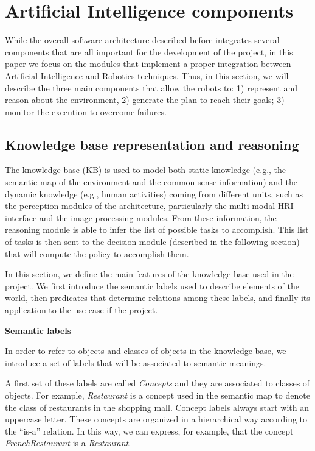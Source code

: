 \section{Artificial Intelligence components}

While the overall software architecture described before integrates several components that are all important for the development of the project, in this paper we focus on the modules that implement a proper integration between Artificial Intelligence and Robotics techniques.
Thus, in this section, we will describe the three main components that allow the robots to: 1) represent and reason about the environment, 2) generate the plan to reach their goals; 3) monitor the execution to overcome failures.



\subsection{Knowledge base representation and reasoning}


The knowledge base (KB) is used to model both static knowledge (e.g., the semantic map of the environment and the common sense information) and the dynamic knowledge (e.g., human activities) coming from different units, such as the perception modules of the architecture, particularly the multi-modal HRI interface and the image processing modules. 
From these information, the reasoning module is able to infer the list of possible tasks to accomplish. This list of tasks is then sent to the decision module (described in the following section) that will compute the policy to accomplish them. 

In this section, we define the main features of the knowledge base used in the project. We first introduce the semantic labels used to describe elements of the world, then predicates that determine relations among these labels, and finally its application to the use case if the project.

\vspace{1em}

\noindent 
\textbf{Semantic labels}

In order to refer to objects and classes of objects in the knowledge base, we introduce a set of labels that will be associated to semantic meanings. 

A first set of these labels are called \emph{Concepts} and they are associated to classes of objects. For example, \emph{Restaurant} is a concept used in the semantic map to denote the class of restaurants in the shopping mall. Concept labels always start with an uppercase letter.
These concepts are organized in a hierarchical way according to the ``is-a'' relation.
In this way, we can express, for example, that the concept \emph{FrenchRestaurant} is a \emph{Restaurant}. 

